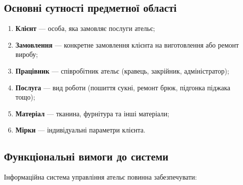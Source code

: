 \documentclass[14pt,a4paper]{extarticle}
\begin{document}
\subsection{Основні сутності предметної області}

\begin{enumerate}
    \item \textbf{Клієнт} --- особа, яка замовляє послуги ательє;
    \item \textbf{Замовлення} --- конкретне замовлення клієнта на виготовлення або ремонт виробу;
    \item \textbf{Працівник} --- співробітник ательє (кравець, закрійник, адміністратор);
    \item \textbf{Послуга} --- вид роботи (пошиття сукні, ремонт брюк, підгонка піджака тощо);
    \item \textbf{Матеріал} --- тканина, фурнітура та інші матеріали;
    \item \textbf{Мірки} --- індивідуальні параметри клієнта.
\end{enumerate}

\subsection{Функціональні вимоги до системи}

Інформаційна система управління ательє повинна забезпечувати:
\end{document}
